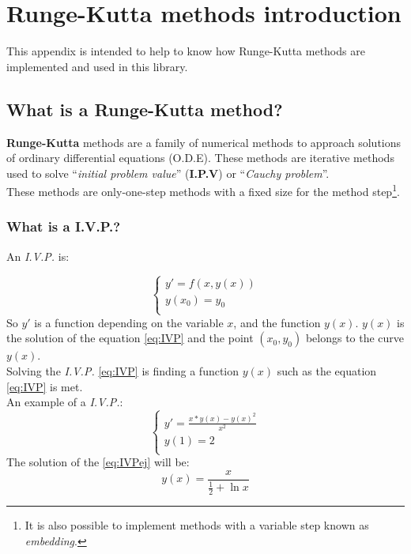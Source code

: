 %
%

\chapter{Runge-Kutta methods introduction} \label{ch:runge}

This appendix is intended to help to know how Runge-Kutta methods are implemented and used in this library.

\section{What is a Runge-Kutta method?}

\textbf{Runge-Kutta} methods are a family of numerical methods to approach solutions of ordinary differential equations (O.D.E). These methods are iterative methods used to solve ``\emph{initial problem value}'' (\textbf{I.P.V}) or ``\emph{Cauchy problem}''.\\

These methods are only-one-step methods with a fixed size for the method step\footnote{It is also possible to implement methods with a variable step known as \emph{embedding}.}.\\

\subsection{What is a I.V.P.?}

An \emph{I.V.P.} is:

\begin{equation} \label{eq:IVP}
\left\{ \begin{array}{l}
y' = f(x, y(x))\\
y(x_0) = y_0\\
\end{array} \right.
\end{equation}
%
So $y'$ is a function depending on the variable $x$, and the function $y(x)$. $y(x)$ is the solution of the equation \ref{eq:IVP} and the point $(x_0,y_0)$ belongs to the curve $y(x)$.\\

Solving the \emph{I.V.P.} \ref{eq:IVP} is finding a function $y(x)$ such as the equation \ref{eq:IVP} is met.\\

An example of a \emph{I.V.P.}:
%
\begin{equation} \label{eq:IVPej}
\left\{ \begin{array}{l}
y' = \frac{x * y(x) - y(x)^2}{x^2} \\
y(1) = 2 \\
\end{array} \right.
\end{equation}
%
The solution of the \ref{eq:IVPej} will be:
%
\begin{equation}
y(x) = \frac{x}{\frac{1}{2}+\ln x}
\end{equation}

